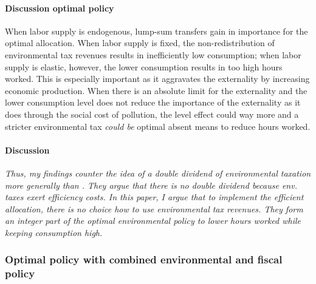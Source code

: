  \paragraph{Discussion optimal policy}

When labor supply is endogenous, lump-sum transfers gain in importance for the optimal allocation. When labor supply is fixed, the non-redistribution of environmental tax revenues results in inefficiently low consumption; when labor supply is elastic, however, the lower consumption results in too high hours worked. This is especially important as it aggravates the externality by increasing economic production. When there is an absolute limit for the externality and the lower consumption level does not reduce the importance of the externality as it does through the social cost of pollution, the level effect could way more and a stricter environmental tax \textit{could be} optimal absent means to reduce hours worked. 


 

 

\paragraph{Discussion}
\textit{Thus, my findings counter the idea of a double dividend of environmental taxation more generally than \cite{LansBovenberg1994EnvironmentalTaxation}. They argue that there is no double dividend because env. taxes exert efficiency costs. In this paper, I argue that to implement the efficient allocation, there is no choice how to use environmental tax revenues. They form an integer part of the optimal environmental policy to lower hours worked while keeping consumption high.}

\subsubsection{Optimal policy with combined environmental and fiscal policy}

